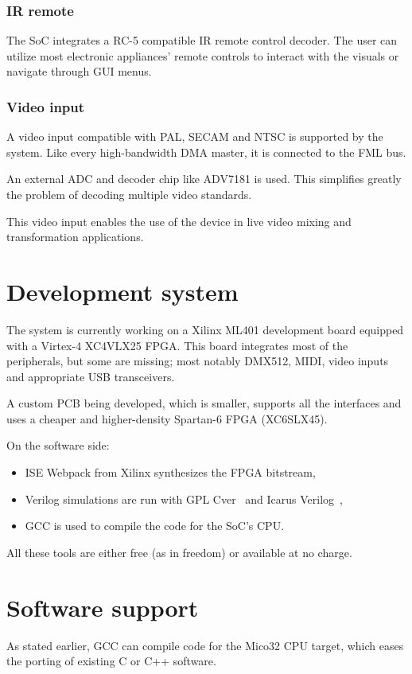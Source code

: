\documentclass[a4paper,11pt,twocolumn]{paper}
\begin{document}
\subsubsection{IR remote}
The SoC integrates a RC-5 compatible IR remote control decoder. The user can utilize most electronic appliances' remote controls to interact with the visuals or navigate through GUI menus.

\subsubsection{Video input}
A video input compatible with PAL, SECAM and NTSC is supported by the system. Like every high-bandwidth DMA master, it is connected to the FML bus.

An external ADC and decoder chip like ADV7181 is used. This simplifies greatly the problem of decoding multiple video standards.

This video input enables the use of the device in live video mixing and transformation applications.

\section{Development system}
The system is currently working on a Xilinx ML401 development board equipped with a Virtex-4 XC4VLX25 FPGA. This board integrates most of the peripherals, but some are missing; most notably DMX512, MIDI, video inputs and appropriate USB transceivers.

A custom PCB being developed, which is smaller, supports all the interfaces and uses a cheaper and higher-density Spartan-6 FPGA (XC6SLX45).

On the software side:
\begin{itemize}
\item ISE Webpack from Xilinx synthesizes the FPGA bitstream,
\item Verilog simulations are run with GPL Cver~\cite{gplcver} and Icarus Verilog~\cite{icarus},
\item GCC is used to compile the code for the SoC's CPU.
\end{itemize}

All these tools are either free (as in freedom) or available at no charge.

\section{Software support}
As stated earlier, GCC can compile code for the Mico32 CPU target, which eases the porting of existing C or C++ software.
\end{document}

